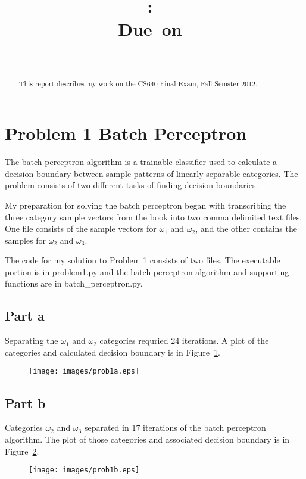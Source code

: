 \documentclass{report}
\title{\vspace{2in}\textmd{\textbf{\hmwkClass:\ \hmwkTitle\ifthenelse{\equal{\hmwkSubTitle}{}}{}{\\\hmwkSubTitle}}}\\\normalsize\vspace{0.1in}\small{Due\ on\ \hmwkDueDate}\\\vspace{0.1in}\large{\textit{\hmwkClassInstructor\ \hmwkClassTime}}\vspace{3in}}
\date{}
\author{\textbf{\hmwkAuthorName}}
\begin{document}
\maketitle

\begin{abstract}
  This report describes my work on the CS640 Final Exam, Fall Semster
  2012.
\end{abstract}


\section*{Problem 1 Batch Perceptron}
The batch perceptron algorithm is a trainable classifier used to
calculate a decision boundary between sample patterns of linearly
separable categories.  The problem consists of two different tasks
of finding decision boundaries.

My preparation for solving the batch perceptron began with
transcribing the three category sample vectors from the book into two
comma delimited text files.  One file consists of the sample vectors
for $\omega_1$ and $\omega_2$, and the other contains the samples for
$\omega_2$ and $\omega_3$.

The code for my solution to Problem 1 consists of two files.  The
executable portion is in problem1.py and the batch perceptron
algorithm and supporting functions are in batch\_perceptron.py.

\subsection*{Part a}
Separating the $\omega_1$ and $\omega_2$ categories requried 24
iterations.  A plot of the categories and calculated decision boundary
is in Figure~\ref{fig:prob1a-batch}.

\begin{figure}
\centering
  \texttt{[image: images/prob1a.eps]}
  \label{fig:prob1a-batch}
\end{figure}

\subsection*{Part b}
Categories $\omega_2$ and $\omega_3$ separated in 17 iterations of the
batch perceptron algorithm.  The plot of those categories and
associated decision boundary is in Figure~\ref{fig:prob1b-batch}.
\begin{figure}
\centering
  \texttt{[image: images/prob1b.eps]}
  \label{fig:prob1b-batch}
\end{figure}
\end{document}
